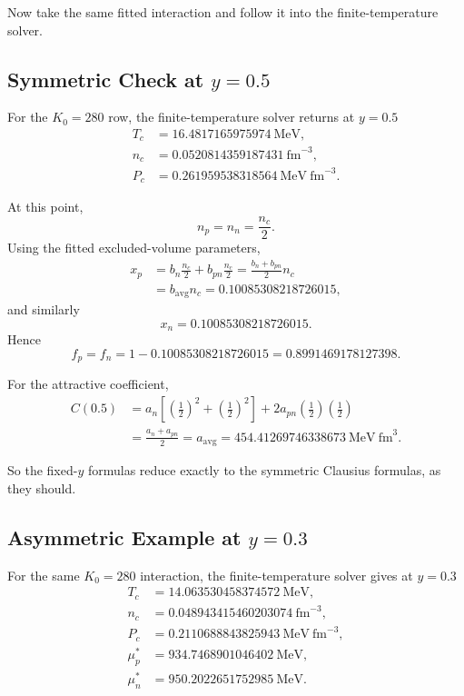 \documentclass[11pt]{article}
\begin{document}
Now take the same fitted interaction and follow it into the finite-temperature
solver.

\subsection{Symmetric Check at \texorpdfstring{$y=0.5$}{y=0.5}}

For the $K_0=280$ row, the finite-temperature solver returns at $y=0.5$
\begin{align}
T_c &= 16.4817165975974\ \mathrm{MeV}, \\
n_c &= 0.0520814359187431\ \mathrm{fm}^{-3}, \\
P_c &= 0.261959538318564\ \mathrm{MeV\ fm}^{-3}.
\end{align}

At this point,
\[
n_p=n_n=\frac{n_c}{2}.
\]
Using the fitted excluded-volume parameters,
\begin{align}
x_p
&=
b_n\frac{n_c}{2}+b_{pn}\frac{n_c}{2}
=
\frac{b_n+b_{pn}}{2}n_c \\
&=
b_{\mathrm{avg}}n_c
=
0.10085308218726015,
\end{align}
and similarly
\[
x_n=0.10085308218726015.
\]
Hence
\[
f_p=f_n=1-0.10085308218726015=0.8991469178127398.
\]

For the attractive coefficient,
\begin{align}
C(0.5)
&=
a_n\left[\left(\frac12\right)^2+\left(\frac12\right)^2\right]
+2a_{pn}\left(\frac12\right)\left(\frac12\right) \\
&=
\frac{a_n+a_{pn}}{2}
=
a_{\mathrm{avg}}
=
454.41269746338673\ \mathrm{MeV\ fm}^3.
\end{align}

So the fixed-$y$ formulas reduce exactly to the symmetric Clausius formulas,
as they should.

\subsection{Asymmetric Example at \texorpdfstring{$y=0.3$}{y=0.3}}

For the same $K_0=280$ interaction, the finite-temperature solver gives at
$y=0.3$
\begin{align}
T_c &= 14.063530458374572\ \mathrm{MeV}, \\
n_c &= 0.048943415460203074\ \mathrm{fm}^{-3}, \\
P_c &= 0.2110688843825943\ \mathrm{MeV\ fm}^{-3}, \\
\mu_p^\ast &= 934.7468901046402\ \mathrm{MeV}, \\
\mu_n^\ast &= 950.2022651752985\ \mathrm{MeV}.
\end{align}
\end{document}
